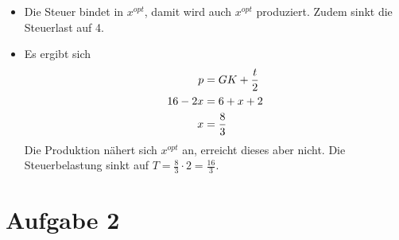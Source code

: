 \documentclass{article}
\begin{document}
\begin{enumerate}[label=(\alph*)]
\begin{itemize}
			\item Die Steuer bindet in $x^{opt}$, damit wird auch $x^{opt}$ produziert. Zudem sinkt die Steuerlast auf 4.
			\item Es ergibt sich
			\begin{align}
				p &= GK + \frac{t}{2} \notag \\
				16-2x &= 6+x+2 \notag \\
				x &= \frac{8}{3} \notag
			\end{align}
			Die Produktion nähert sich $x^{opt}$ an, erreicht dieses aber nicht. Die Steuerbelastung sinkt auf $T=\frac{8}{3}\cdot 2=\frac{16}{3}$.
		\end{itemize}
	\end{enumerate}
	
	\section*{Aufgabe 2}
\end{document}

